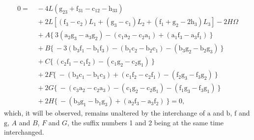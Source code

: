 \documentclass[11pt,a4paper]{article}
\begin{document}
\begin{align*}
0 = &\,-4L(\text{g}_{23} + \text{f}_{31} - \text{c}_{12} - \text{h}_{33})\\
    &\,+ 2L[(\text{f}_{3} - \text{c}_{2})L_{1} + (\text{g}_{3} - \text{c}_{1})L_{2} + (\text{f}_{1} + \text{g}_{2} - 2\text{h}_{3})L_{3}] - 2H\Omega\\
    &\,+ A\{\ 3(\text{a}_{2}\text{g}_{3} - \text{a}_{3}\text{g}_{2}) - (\text{c}_{1}\text{a}_{2} - \text{c}_{2}\text{a}_{1}) + (\text{a}_{1}\text{f}_{3} - \text{a}_{3}\text{f}_{1})\ \}\\
    &\,+ B\{\ -3(\text{b}_{3}\text{f}_{1} - \text{b}_{1}\text{f}_{3}) - (\text{b}_{1}\text{c}_{2} - \text{b}_{2}\text{c}_{1}) - (\text{b}_{3}\text{g}_{2} - \text{b}_{2}\text{g}_{3})\ \}\\
    &\,+ C\{\ (\text{c}_{2}\text{f}_{1} - \text{c}_{1}\text{f}_{2}) - (\text{c}_{1}\text{g}_{2} - \text{c}_{2}\text{g}_{1})\ \}\\
    &\,+ 2F\{\ -(\text{b}_{3}\text{c}_{1} - \text{b}_{1}\text{c}_{3}) + (\text{c}_{1}\text{f}_{2} - \text{c}_{2}\text{f}_{1}) - (\text{f}_{2}\text{g}_{3} - \text{f}_{3}\text{g}_{2})\ \}\\
    &\,+ 2G\{\ -(\text{c}_{3}\text{a}_{2} - \text{c}_{2}\text{a}_{3}) - (\text{c}_{1}\text{g}_{2} - \text{c}_{2}\text{g}_{1}) - (\text{f}_{1}\text{g}_{3} - \text{f}_{3}\text{g}_{1})\ \}\\
    &\,+ 2H\{\ -(\text{b}_{3}\text{g}_{1} - \text{b}_{1}\text{g}_{3}) + (\text{a}_{2}\text{f}_{3} - \text{a}_{3}\text{f}_{2})\ \} = 0,
\end{align*}
which, it will be observed, remains unaltered by the interchange of $\text{a}$ and $\text{b}$, $\text{f}$ and $\text{g}$, $A$ and $B$, $F$ and $G$, the suffix numbers 1 and 2 being at the same time interchanged.
\end{document}
